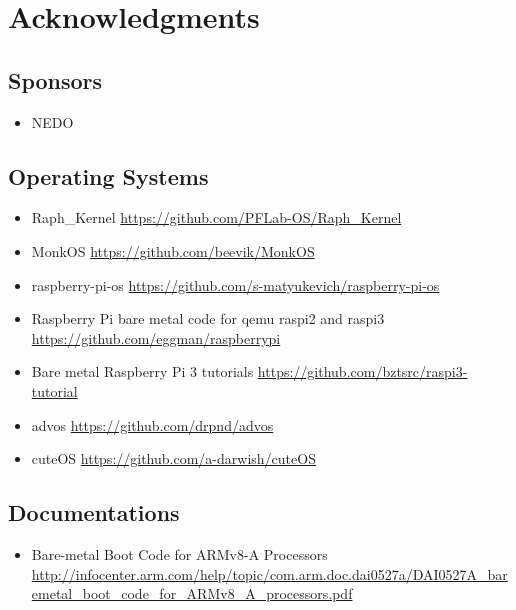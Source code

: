 \section{Acknowledgments}

\subsection{Sponsors}

\begin{itemize}
\item NEDO
\end{itemize}

\subsection{Operating Systems}

\begin{itemize}
\item Raph\_Kernel
  \url{https://github.com/PFLab-OS/Raph_Kernel}
\item MonkOS
  \url{https://github.com/beevik/MonkOS}
\item raspberry-pi-os
  \url{https://github.com/s-matyukevich/raspberry-pi-os}
\item Raspberry Pi bare metal code for qemu raspi2 and raspi3
  \url{https://github.com/eggman/raspberrypi}
\item Bare metal Raspberry Pi 3 tutorials
  \url{https://github.com/bztsrc/raspi3-tutorial}
\item advos
  \url{https://github.com/drpnd/advos}
\item cuteOS
  \url{https://github.com/a-darwish/cuteOS}
\end{itemize}

\subsection{Documentations}

\begin{itemize}
\item Bare-metal Boot Code for ARMv8-A Processors
  \url{http://infocenter.arm.com/help/topic/com.arm.doc.dai0527a/DAI0527A_baremetal_boot_code_for_ARMv8_A_processors.pdf}
\end{itemize}

